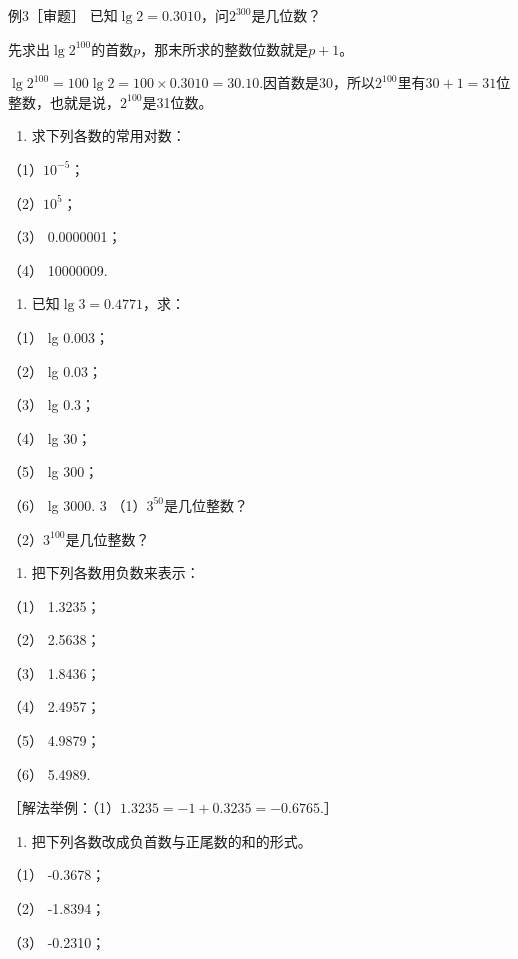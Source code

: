 例3［审题］ 已知\(\lg 2 = 0.3010\)，问\(2^{300}\)是几位数？

先求出\(\lg 2^{100}\)的首数\(p\)，那末所求的整数位数就是\(p + 1\)。

\(\lg 2^{100} = 100\lg 2 = 100 \times 0.3010 = 30.10.\)因首数是30，所以\(2^{100}\)里有\(30 + 1 = 31\)位整数，也就是说，\(2^{100}\)是31位数。

\begin{enumerate}
\item
  求下列各数的常用对数：
\end{enumerate}

（1）\(10^{-5}\)；

（2）\(10^{5}\)；

（3） 0.0000001；

（4） 10000009.

\begin{enumerate}[start=2]
\item
  已知\(\lg 3 = 0.4771\)，求：
\end{enumerate}

（1） lg 0.003；

（2） lg 0.03；

（3） lg 0.3；

（4） lg 30；

（5） lg 300；

（6） lg 3000. 3 （1）\(3^{50}\)是几位整数？

（2）\(3^{100}\)是几位整数？

\begin{enumerate}[start=4]
\item
  把下列各数用负数来表示：
\end{enumerate}

（1） 1.3235；

（2） 2.5638；

（3） 1.8436；

（4） 2.4957；

（5） 4.9879；

（6） 5.4989.

［解法举例：（1）\(1.3235 = -1 + 0.3235 = -0.6765\).］

\begin{enumerate}[start=5]
\item
  把下列各数改成负首数与正尾数的和的形式。
\end{enumerate}

（1） -0.3678；

（2） -1.8394；

（3） -0.2310；

